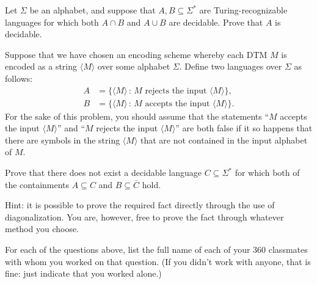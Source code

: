 \documentclass[11pt]{article}
\newenvironment{mylist}[1]{\begin{list}{}{
	\setlength{\leftmargin}{#1}
	\setlength{\rightmargin}{0mm}
	\setlength{\labelsep}{2mm}
	\setlength{\labelwidth}{8mm}
	\setlength{\itemsep}{0mm}}}
	{\end{list}}
\newcounter{questioncounter}
\newenvironment{question}{
  \begin{mylist}{\parindent}
  \item[\stepcounter{questioncounter}
    \thequestioncounter.]}{
\end{mylist}}
\begin{document}

\begin{question}[6 points]
  Let $\Sigma$ be an alphabet, and suppose that $A,B\subseteq\Sigma^{\ast}$
  are Turing-recognizable languages for which both $A\cap B$ and $A \cup B$ are
  decidable.
  Prove that $A$ is decidable.
\end{question}


\begin{question}[6 points]
  Suppose that we have chosen an encoding scheme whereby each DTM $M$ is
  encoded as a string $\langle M \rangle$ over some alphabet $\Sigma$.
  Define two languages over $\Sigma$ as follows:
  \begin{align*}
    A & = \bigl\{ \langle M \rangle \,:\, \text{$M$ rejects the input
      $\langle M \rangle$} \bigr\},\\
    B & = \bigl\{ \langle M \rangle \,:\, \text{$M$ accepts the input
      $\langle M \rangle$} \bigr\}.
  \end{align*}
  For the sake of this problem, you should assume that the statements
  ``$M$ accepts the input $\langle M\rangle$'' and
  ``$M$ rejects the input $\langle M\rangle$'' are both false if it so happens
  that there are symbols in the string $\langle M\rangle$ that are not
  contained in the input alphabet of $M$.

  Prove that there does not exist a decidable language
  $C\subseteq\Sigma^{\ast}$ for which both of the containments $A\subseteq C$
  and $B \subseteq \overline{C}$ hold.

  Hint: it is possible to prove the required fact directly through the use of
  diagonalization.
  You are, however, free to prove the fact through whatever method you choose.
\end{question}


\begin{question}[1 point]
  For each of the questions above, list the full name of each of your 360
  classmates with whom you worked on that question.
  (If you didn't work with anyone, that is fine: just indicate that you worked
  alone.)
\end{question}

\end{document}
